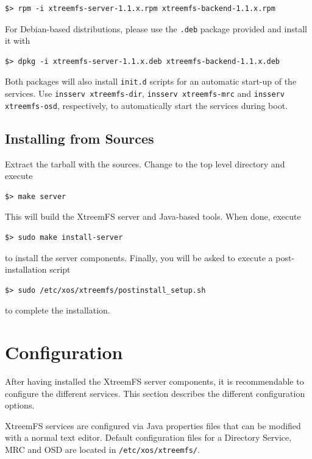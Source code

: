 \documentclass[a4paper,10pt]{book}
\begin{document}
\begin{verbatim}
$> rpm -i xtreemfs-server-1.1.x.rpm xtreemfs-backend-1.1.x.rpm
\end{verbatim}


For Debian-based distributions, please use the \texttt{.deb} package provided and install it with


\begin{verbatim}
$> dpkg -i xtreemfs-server-1.1.x.deb xtreemfs-backend-1.1.x.deb
\end{verbatim}


Both packages will also install \texttt{init.d} scripts for an automatic start-up of the services. Use \texttt{insserv xtreemfs-dir}, \texttt{insserv xtreemfs-mrc} and \texttt{insserv xtreemfs-osd}, respectively, to automatically start the services during boot.

\subsection{Installing from Sources}

Extract the tarball with the sources. Change to the top level directory and execute

\begin{verbatim}
$> make server
\end{verbatim}

This will build the XtreemFS server and Java-based tools. When done, execute

\begin{verbatim}
$> sudo make install-server
\end{verbatim}

to install the server components. Finally, you will be asked to execute a post-installation script

\begin{verbatim}
$> sudo /etc/xos/xtreemfs/postinstall_setup.sh
\end{verbatim}

to complete the installation.

\section{Configuration}
\label{sec:service_config}

After having installed the XtreemFS server components, it is recommendable to configure the different services. This section describes the different configuration options.

XtreemFS services are configured via Java properties files that can be modified with a normal text editor. Default configuration files for a Directory Service, MRC and OSD are located in \texttt{/etc/xos/xtreemfs/}.
\end{document}
